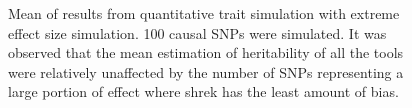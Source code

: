 \begin{figure}
{				
				\label{fig:ldscInQtEx100cMean}
			}
			\caption[Quantitative Trait with Extreme Effect Size Simulation Result(100 causal SNPs, Mean)]
			{Mean of results from quantitative trait simulation with extreme effect size simulation.
				100 causal \glspl{SNP} were simulated.
				It was observed that the mean estimation of heritability of all the tools were relatively unaffected by the number of \glspl{SNP} representing a large portion of effect where \gls{shrek} has the least amount of bias.
				} 
			\label{fig:QtEx100cMean}
		\end{figure}
		
